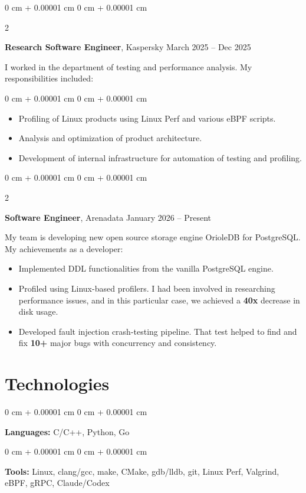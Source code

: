\documentclass[10pt, letterpaper]{article}
\newenvironment{highlights}{
    \begin{itemize}[
        topsep=0.10 cm,
        parsep=0.10 cm,
        partopsep=0pt,
        itemsep=0pt,
        leftmargin=0 cm + 10pt
    ]
}{
    \end{itemize}
} %
\newenvironment{onecolentry}{
    \begin{adjustwidth}{
        0 cm + 0.00001 cm
    }{
        0 cm + 0.00001 cm
    }
}{
    \end{adjustwidth}
} %
\newenvironment{twocolentry}[2][]{
    \onecolentry
    \def\secondColumn{#2}
    \setcolumnwidth{\fill, 4.5 cm}
    \begin{paracol}{2}
}{
    \switchcolumn \raggedleft \secondColumn
    \end{paracol}
    \endonecolentry
} %
\begin{document}
        \vspace{0.4 cm}
        \begin{twocolentry}{
            March 2025 – Dec 2025
        }
            \textbf{Research Software Engineer}, Kaspersky\end{twocolentry}
            \vspace{0.10 cm}
I worked in the department of testing and performance analysis. My responsibilities included:
        \vspace{0.10 cm}
        \begin{onecolentry}
            \begin{highlights}
                \item Profiling of Linux products using Linux Perf and various eBPF scripts.
                \item Analysis and optimization of product architecture.
                \item Development of internal infrastructure for automation of testing and profiling.
            \end{highlights}
        \end{onecolentry}

        \vspace{0.4 cm}
        \begin{twocolentry}{
            January 2026 – Present
        }
            \textbf{Software Engineer}, Arenadata \end{twocolentry}
            \vspace{0.10 cm}
    My team is developing new open source storage engine OrioleDB for PostgreSQL. My achievements as a developer:
    \begin{highlights}
        \item Implemented DDL functionalities from the vanilla PostgreSQL engine.
        \item Profiled using Linux-based profilers. I had been involved in researching performance issues, and in this particular case, we achieved a \textbf{40x} decrease in disk usage.
        \item Developed fault injection crash-testing pipeline. That test helped to find and fix \textbf{10+} major bugs with concurrency and consistency. 
    \end{highlights}
            \vspace{0.2 cm}


    \section{Technologies}
        \begin{onecolentry}
            \textbf{Languages:} C/C++, Python, Go \end{onecolentry}
        \begin{onecolentry}
            \textbf{Tools:} Linux, clang/gcc, make, CMake, gdb/lldb, git, Linux Perf, Valgrind, eBPF, gRPC, Claude/Codex
\end{onecolentry}
\end{document}
